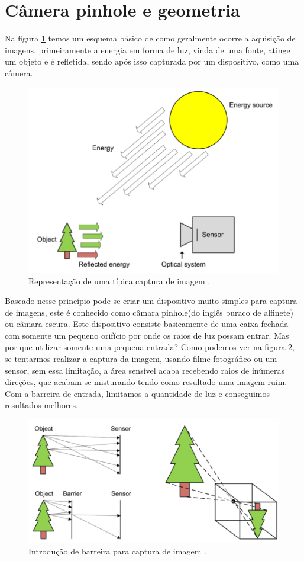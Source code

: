 \documentclass[
  brazilian,
]{book}
\begin{document}
\hypertarget{cuxe2mera-pinhole-e-geometria}{%
\section{Câmera pinhole e geometria}\label{cuxe2mera-pinhole-e-geometria}}

Na figura \ref{fig:aquisicaoimagem} temos um esquema básico de como geralmente ocorre a aquisição de imagens, primeiramente a energia em forma de luz, vinda de uma fonte, atinge um objeto e é refletida, sendo após isso capturada por um dispositivo, como uma câmera.



\begin{figure}

{\centering \includegraphics[width=0.55\linewidth]{imagens/02-formacao/aquisicao_imagem} 

}

\caption{Representação de uma típica captura de imagem \autocite[p.8]{moeslund2012}.}\label{fig:aquisicaoimagem}
\end{figure}

Baseado nesse princípio pode-se criar um dispositivo muito simples para captura de imagens, este é conhecido como câmara pinhole(do inglês buraco de alfinete) ou câmara escura. Este dispositivo consiste basicamente de uma caixa fechada com somente um pequeno orifício por onde os raios de luz possam entrar. Mas por que utilizar somente uma pequena entrada? Como podemos ver na figura \ref{fig:barreiraluz}, se tentarmos realizar a captura da imagem, usando filme fotográfico ou um sensor, sem essa limitação, a área sensível acaba recebendo raios de inúmeras direções, que acabam se misturando tendo como resultado uma imagem ruim. Com a barreira de entrada, limitamos a quantidade de luz e conseguimos resultados melhores.



\begin{figure}

{\centering \includegraphics[width=0.55\linewidth]{imagens/02-formacao/barreiraluz} 

}

\caption{Introdução de barreira para captura de imagem \autocite[p.11]{moeslund2012}.}\label{fig:barreiraluz}
\end{figure}
\end{document}
